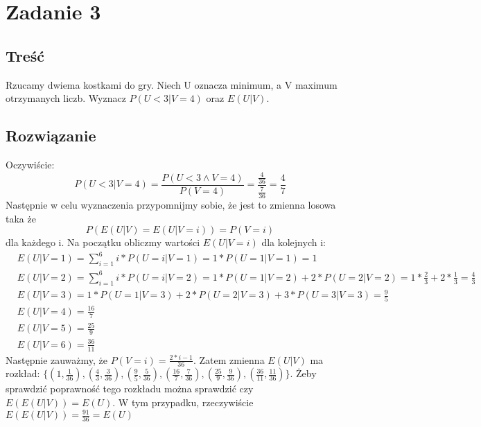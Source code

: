 \documentclass[10pt, a4paper]{article}
\begin{document}
\section*{Zadanie 3}
\subsection*{Treść}
Rzucamy dwiema kostkami do gry. Niech U oznacza minimum, a V maximum otrzymanych liczb. Wyznacz $P(U<3|V=4)$ oraz $E(U|V)$.
\subsection*{Rozwiązanie}
Oczywiście:
\begin{equation}
P(U < 3|V = 4) = \frac{P(U < 3 \wedge V=4)}{P(V=4)} =\frac{\frac{4}{36}}{\frac{7}{36}} = \frac{4}{7}
\end{equation}
Następnie w celu wyznaczenia przypomnijmy sobie, że jest to zmienna losowa taka że
\begin{equation}
P(E(U|V) = E(U|V=i)) = P(V=i)
\end{equation}
dla każdego i. Na początku obliczmy wartości $E(U|V = i)$ dla kolejnych i:
\begin{align*}
& E(U | V = 1) = \sum_{i=1}^6 i * P(U = i | V = 1) = 1 * P(U = 1 | V = 1) = 1 \\
& E(U | V = 2) = \sum_{i=1}^6 i * P(U = i | V = 2) = 1 * P(U = 1 | V = 2) + 2 * P(U = 2 | V = 2) = 1 * \frac{2}{3} + 2 * \frac{1}{3} = \frac{4}{3} \\
& E(U | V = 3) = 1 * P(U = 1 | V = 3) + 2 * P(U = 2 | V = 3) + 3 * P(U = 3 | V = 3) = \frac{9}{5} \\
& E(U | V = 4) = \frac{16}{7} \\
& E(U | V = 5) = \frac{25}{9} \\
& E(U | V = 6) = \frac{36}{11}
\end{align*}
Następnie zauważmy, że $P(V=i) = \frac{2*i-1}{36}$. Zatem zmienna $E(U|V)$ ma rozkład: $\{ (1, \frac{1}{36}), (\frac{4}{3}, \frac{3}{36}), (\frac{9}{5}, \frac{5}{36}), (\frac{16}{7}, \frac{7}{36}), (\frac{25}{9}, \frac{9}{36}), (\frac{36}{11}, \frac{11}{36})\}$. Żeby sprawdzić poprawność tego rozkładu można sprawdzić czy $E(E(U|V)) = E(U)$. W tym przypadku, rzeczywiście $E(E(U|V)) = \frac{91}{36} = E(U)$
\end{document}
